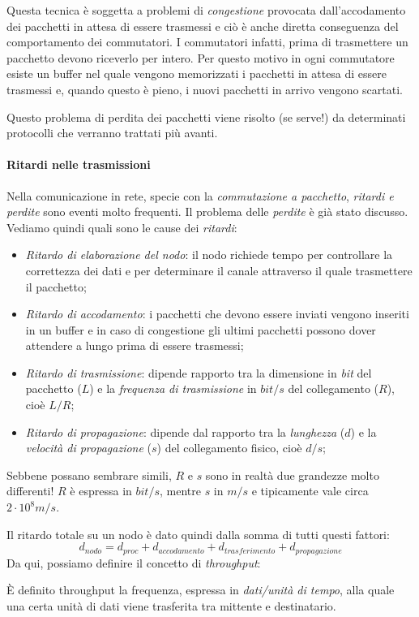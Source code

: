 Questa tecnica è soggetta a problemi di \emph{congestione} provocata dall'accodamento
dei pacchetti in attesa di essere trasmessi e ciò è anche diretta conseguenza
del comportamento dei commutatori. I commutatori infatti, prima di trasmettere un
pacchetto devono riceverlo per intero. Per questo motivo in ogni commutatore esiste
un buffer nel quale vengono memorizzati i pacchetti in attesa di essere
trasmessi e, quando questo è pieno, i nuovi pacchetti in arrivo vengono scartati.

Questo problema di perdita dei pacchetti viene risolto (se serve!) da determinati
protocolli che verranno trattati più avanti.

\paragraph{Ritardi nelle trasmissioni}
Nella comunicazione in rete, specie con la \emph{commutazione a pacchetto},
\emph{ritardi e perdite} sono eventi molto frequenti. Il problema delle
\emph{perdite} è già stato discusso. Vediamo quindi quali sono le cause dei
\emph{ritardi}:
\begin{itemize}
    \item \emph{Ritardo di elaborazione del nodo}: il nodo richiede tempo per
    controllare la correttezza dei dati e per determinare il canale attraverso il
    quale trasmettere il pacchetto;
    \item \emph{Ritardo di accodamento}: i pacchetti che devono essere inviati
    vengono inseriti in un buffer e in caso di congestione gli ultimi pacchetti
    possono dover attendere a lungo prima di essere trasmessi;
    \item \emph{Ritardo di trasmissione}: dipende rapporto tra la dimensione in
    \emph{bit} del pacchetto ($L$) e la \emph{frequenza di trasmissione} in
    $bit/s$ del collegamento ($R$), cioè $L/R$;
    \item \emph{Ritardo di propagazione}: dipende dal rapporto tra la
    \emph{lunghezza} ($d$) e la \emph{velocità di propagazione} ($s$) del
    collegamento fisico, cioè $d/s$;
\end{itemize}

\begin{note}
    Sebbene possano sembrare simili, $R$ e $s$ sono in realtà due grandezze molto
    differenti! $R$ è espressa in $bit/s$, mentre $s$ in $m/s$ e tipicamente vale
    circa $2\cdot 10^8m/s$.
\end{note}\noindent
Il ritardo totale su un nodo è dato quindi dalla somma di tutti questi fattori:
\[d_{nodo}=d_{proc}+d_{accodamento}+d_{trasferimento}+d_{propagazione}\]
Da qui, possiamo definire il concetto di \emph{throughput}:
\begin{definition}[Throughput]
    È definito throughput la frequenza, espressa in \emph{dati/unità di tempo},
    alla quale una certa unità di dati viene trasferita tra mittente e destinatario.
\end{definition}

